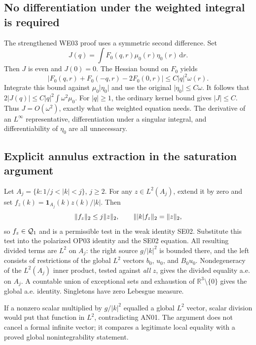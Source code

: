 \documentclass[11pt,a4paper]{article}
\theoremstyle{remark}\newtheorem{remark}[theorem]{Remark}
\newcommand{\R}{\mathbb R}\newcommand{\C}{\mathbb C}\newcommand{\N}{\mathbb N}
\newcommand{\abs}[1]{\lvert #1\rvert}\newcommand{\rankone}[2]{\lvert #1\rangle\langle #2\rvert}
\newcommand{\dd}{\,\mathrm d}\newcommand{\almosteverywhere}{\text{a.e.}}
\begin{document}
\subsection{No differentiation under the weighted integral is required}
The strengthened WE03 proof uses a symmetric second difference. Set
\[
 J(q)=\int F_0(q,r)\mu_0(r)\eta_0(r)\dd r.
\]
Then $J$ is even and $J(0)=0$. The Hessian bound on $F_0$ yields
\[
 \abs{F_0(q,r)+F_0(-q,r)-2F_0(0,r)}
       \leq C\abs q^2\omega(r).
\]
Integrate this bound against $\mu_0\abs{\eta_0}$ and use the original
$\abs{\eta_0}\leq C\omega$. It follows that
$2\abs{J(q)}\leq C\abs q^2\int\omega^2\mu_0$.
For $\abs q\geq1$, the ordinary kernel bound gives $\abs J\leq C$. Thus $J=O(\omega^2)$, exactly what the weighted equation needs. The derivative of an $L^\infty$ representative, differentiation under a singular integral, and differentiability of $\eta_0$ are all unnecessary.

\subsection{Explicit annulus extraction in the saturation argument}
Let $A_j=\{k:1/j<\abs k<j\}$, $j\geq2$. For any $z\in L^2(A_j)$, extend it by zero and set
$f_z(k)=\mathbf1_{A_j}(k)z(k)/\abs k$. Then
\[
 \norm{f_z}_2\leq j\norm z_2,\qquad
 \norm{\abs k f_z}_2=\norm z_2,
\]
so $f_z\in\mathcal Q_1$ and is a permissible test in the weak identity SE02. Substitute this test into the polarized OP03 identity and the SE02 equation. All resulting divided terms are $L^2$ on $A_j$: the right source $g/\abs k^2$ is bounded there, and the left consists of restrictions of the global $L^2$ vectors $b_0$, $u_0$, and $B_0u_0$. Nondegeneracy of the $L^2(A_j)$ inner product, tested against \emph{all} $z$, gives the divided equality a.e. on $A_j$. A countable union of exceptional sets and exhaustion of $\R^3\setminus\{0\}$ gives the global a.e. identity. Singletons have zero Lebesgue measure.

If a nonzero scalar multiplied by $g/\abs k^2$ equalled a global $L^2$ vector, scalar division would put that function in $L^2$, contradicting AN01. The argument does not cancel a formal infinite vector; it compares a legitimate local equality with a proved global nonintegrability statement.
\end{document}
